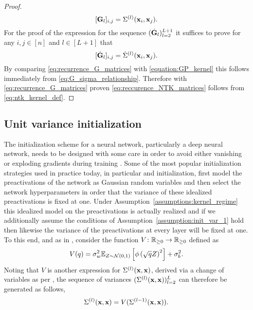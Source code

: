 \begin{proof}
    \begin{equation} \label{eq:G_sigma_relationship}
        [\mathbf{G}_{l}]_{i,j} = \Sigma^{(l)}(\mathbf x_i, \mathbf x_j).
    \end{equation}
    For the proof of the expression for the sequence $(\dot{\mathbf{G}}_l)_{l=2}^{L+1}$ it suffices to prove for any $i,j\in[n]$ and $l \in [L+1]$ that
    \[
    [\dot{\mathbf{G}}_{l}]_{i,j} = \dot{\Sigma}^{(l)}(\mathbf x_i, \mathbf x_j).
    \]
    By comparing \eqref{eq:recurrence_G_matrices} with \eqref{equation:GP_kernel} this follows immediately from \eqref{eq:G_sigma_relationship}. Therefore with \eqref{eq:recurrence_G_matrices} proven \eqref{eq:reccurence_NTK_matrices} follows from \eqref{eq:ntk_kernel_def}. 
\end{proof}


\subsection{Unit variance initialization}\label{appendix:unit_var_init}
The initialization scheme for a neural network, particularly a deep neural network, needs to be designed with some care in order to avoid either vanishing or exploding gradients during training \cite{pmlr-v9-glorot10a, 7410480, DBLP:journals/corr/MishkinM15,LeCuBottOrrMull9812}. Some of the most popular initialization strategies used in practice today, in particular \cite{LeCuBottOrrMull9812} and \cite{pmlr-v9-glorot10a} initialization, first model the preactivations of the network as Gaussian random variables and then select the network hyperparameters in order that the variance of these idealized preactivations is fixed at one. Under Assumption~\ref{assumptions:kernel_regime} this idealized model on the preactivations is actually realized and if we additionally assume the conditions of Assumption~\ref{assumption:init_var_1} hold then likewise the variance of the preactivations at every layer will be fixed at one. To this end, and as in \cite{Poole2016, MURRAY2022117}, consider the function $V\colon \mathbb{R}_{\geq 0} \rightarrow \mathbb{R}_{\geq 0}$ defined as 
\begin{equation}\label{eq:var_func}
    V(q) = \sigma_w^2 \mathbb{E}_{Z\sim \mathcal{N}(0,1)}\left[\phi\left(\sqrt{q}Z \right)^2 \right] +  \sigma_b^2. 
\end{equation}
Noting that $V$ is another expression for $\Sigma^{(l)}(\mathbf x, \mathbf x)$, derived via a change of variables as per \cite{Poole2016}, the sequence of variances $(\Sigma^{(l)}(\mathbf x,\mathbf x))_{l=2}^L$ can therefore be generated as follows,
\begin{equation} \label{eq:var_generator}
    \Sigma^{(l)}(\mathbf x,\mathbf x) = V(\Sigma^{(l-1)}(\mathbf x,\mathbf x)).
\end{equation}

